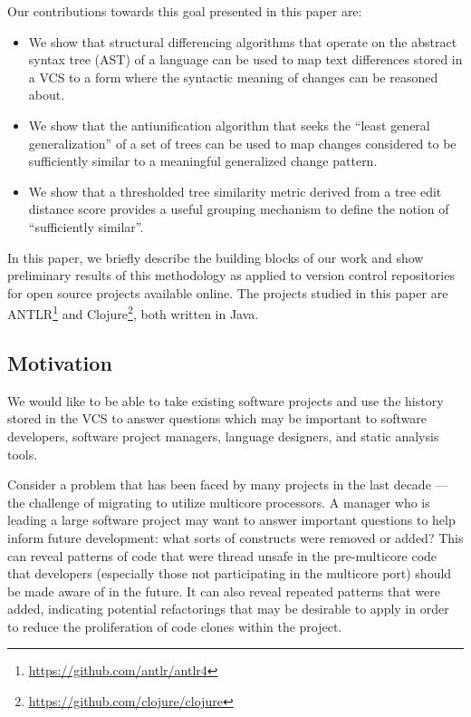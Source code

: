 Our contributions towards this goal presented in this paper are:

\begin{itemize}

\item We show that structural differencing algorithms that operate on the
abstract syntax tree (AST) of a language can be used to map text
differences stored in a VCS to a form where the syntactic meaning of changes
can be reasoned about.

\item We show that the antiunification algorithm that seeks the ``least general
generalization'' of a set of trees can be used to map changes considered to be
sufficiently similar to a meaningful generalized change pattern.

\item We show that a thresholded tree similarity metric derived from
a tree edit distance score provides a useful grouping mechanism to define
the notion of ``sufficiently similar''.

\end{itemize}

In this paper, we briefly describe the building blocks of our work and show
preliminary results of this methodology as applied to version control
repositories for open source projects available online.  The projects studied
in this paper are ANTLR\footnote{\url{https://github.com/antlr/antlr4}} and
Clojure\footnote{\url{https://github.com/clojure/clojure}}, both written in
Java.

\subsection{Motivation}
\label{sec:motivation}

We would like to be able to take existing software projects and use the history
stored in the VCS to answer questions which may be important to software
developers, software project managers, language designers, and static analysis
tools.

Consider a problem that has been faced by many projects in the last decade ---
the challenge of migrating to utilize multicore processors.  A manager who is
leading a large software project may want to answer important questions to
help inform future development: what sorts of constructs were removed or added?
This can reveal patterns of code that were thread unsafe in the pre-multicore
code that developers (especially those not participating in the multicore port)
should be made aware of in the future.  It can also reveal repeated patterns that
were added, indicating potential refactorings that may be desirable to apply
in order to reduce the proliferation of code clones within the project.


